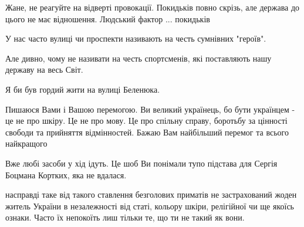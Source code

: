 \begin{itemize}
 
Жане, не реагуйте на відверті провокації. Покидьків повно скрізь, але держава до цього не має відношення. Людський фактор ... покидьків

 

У нас часто вулиці чи проспекти називають на честь сумнівних "героїв".

Але дивно, чому не називати на честь спортсменів, які поставляють нашу державу
на весь Світ.

Я би був гордий жити на вулиці Беленюка.

 

Пишаюся Вами і Вашою перемогою. Ви великий українець, бо бути українцем - це не
про шкіру. Це не про мову. Це про спільну справу, боротьбу за цінності свободи
та прийняття відмінностей. Бажаю Вам найбільший перемог та всього найкращого


 

Вже любі засоби у хід ідуть. Це шоб Ви понімали тупо підстава для Сергія
Боцмана Кортких, яка не вдалася.


 

насправді таке від такого ставлення безголових приматів не застрахований жоден
житель України в незалежності від статі, кольору шкіри, релігійної чи ще якоїсь
ознаки. Часто їх непокоїть лиш тільки те, що ти не такий як вони.



\end{itemize}
